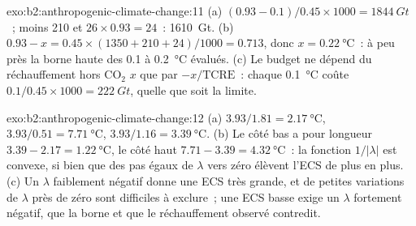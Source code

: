 \begin{solution}{exo:b2:anthropogenic-climate-change:11}
(a) $(0.93 - 0.1)/0.45 \times 1000 = \qty{1844}{Gt}$~; moins 210 et $26 \times 0.93 = 24$~:
\qty{1610}{Gt}. (b) $0.93 - x = 0.45 \times (1350 + 210 + 24)/1000 = 0.713$, donc $x =
\qty{0.22}{\celsius}$~: à peu près la borne haute des 0.1 à \qty{0.2}{\celsius} évalués. (c)
Le budget ne dépend du réchauffement hors CO$_2$ $x$ que par $-x/\text{TCRE}$~: chaque
\qty{0.1}{\celsius} coûte $0.1/0.45 \times 1000 = \qty{222}{Gt}$, quelle que soit la limite.
\end{solution}

\begin{solution}{exo:b2:anthropogenic-climate-change:12}
(a) $3.93/1.81 = \qty{2.17}{\celsius}$, $3.93/0.51 = \qty{7.71}{\celsius}$, $3.93/1.16 =
\qty{3.39}{\celsius}$. (b) Le côté bas a pour longueur $3.39 - 2.17 = \qty{1.22}{\celsius}$, le côté haut
$7.71 - 3.39 = \qty{4.32}{\celsius}$~: la fonction $1/|\lambda|$ est convexe, si bien que des pas égaux de
$\lambda$ vers zéro élèvent l'ECS de plus en plus. (c) Un $\lambda$ faiblement négatif donne une ECS très
grande, et de petites variations de $\lambda$ près de zéro sont difficiles à exclure~; une ECS basse exige
un $\lambda$ fortement négatif, que la  borne et que le réchauffement observé contredit.
\end{solution}

